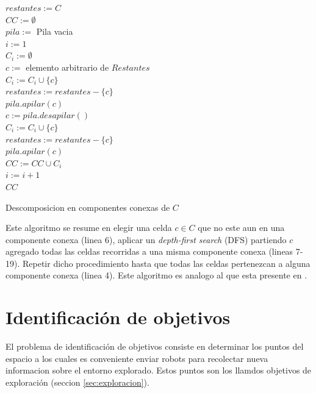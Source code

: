 \begin{algorithm}[H]
\SetAlgoLined
  $restantes := C$ \\
  $CC := \emptyset$ \\
  $pila :=$ Pila vacia \\
  $i := 1$ \\
   {
    $C_i := \emptyset $ \\
    $c :=$ elemento arbitrario de $Restantes$ \\


    $C_i :=  C_i \cup \{c\}$ \\
    $restantes := restantes - \{c\}$ \\
    $pila.apilar(c)$ \\
     {
      $c := pila.desapilar()$ \\
       {
         {
          $C_i :=  C_i \cup \{c\}$ \\
          $restantes := restantes - \{c\}$ \\
          $pila.apilar(c)$ \\
        }
      }
    }
    $CC := CC \cup C_i$ \\
    $i := i + 1$ \\
  }
  \Return $CC$ 

  \caption{Descomposicion en componentes conexas de $C$}
  \label{alg:compcon}
\end{algorithm}

Este algoritmo se resume en elegir una celda $c\in C$ que no este aun en una
componente conexa (linea 6), aplicar un \emph{depth-first search} (DFS)
partiendo $c$ agregado todas las celdas recorridas a una misma componente
conexa (lineas 7-19). Repetir dicho procedimiento hasta que todas las celdas
pertenezcan a alguna componente conexa (linea 4). Este algoritmo es analogo al
que esta presente en \cite{hopcroft1973algorithm}.

\section{Identificación de objetivos}\label{sec:pc:idobj}
El problema de identificación de objetivos consiste en determinar los puntos
del espacio a los cuales es conveniente enviar robots para recolectar nueva
informacion sobre el entorno explorado. Estos puntos son los llamdos objetivos
de exploración (seccion \ref{sec:exploracion}). 

